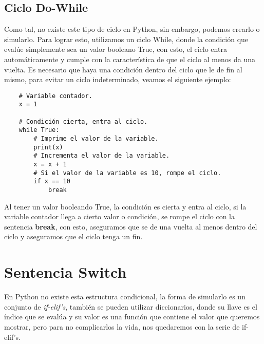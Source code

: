 \subsection{Ciclo Do-While}
\hspace{0.55cm}Como tal, no existe este tipo de ciclo en Python, sin embargo, podemos crearlo o simularlo. Para lograr esto, utilizamos un ciclo While, donde la condición que evalúe simplemente sea un valor booleano True, con esto, el ciclo entra automáticamente y cumple con la característica de que el ciclo al menos da una vuelta. Es necesario que haya una condición dentro del ciclo que le de fin al mismo, para evitar un ciclo indeterminado, veamos el siguiente ejemplo:
\begin{lstlisting}
	# Variable contador.
	x = 1
	
	# Condición cierta, entra al ciclo.
	while True:
		# Imprime el valor de la variable.
		print(x)
		# Incrementa el valor de la variable.
		x = x + 1
		# Si el valor de la variable es 10, rompe el ciclo.
		if x == 10
			break
\end{lstlisting}

Al tener un valor booleando True, la condición es cierta y entra al ciclo, si la variable contador llega a cierto valor o condición, se rompe el ciclo con la sentencia \textbf{break}, con esto, aseguramos que se de una vuelta al menos dentro del ciclo y aseguramos que el ciclo tenga un fin.



\section{Sentencia Switch}
\hspace{0.55cm}En Python no existe esta estructura condicional, la forma de simularlo es un conjunto de \textit{if-elif's}, también se pueden utilizar diccionarios, donde su llave es el índice que se evalúa y su valor es una función que contiene el valor que queremos mostrar, pero para no complicarlos la vida, nos quedaremos con la serie de if-elif's.